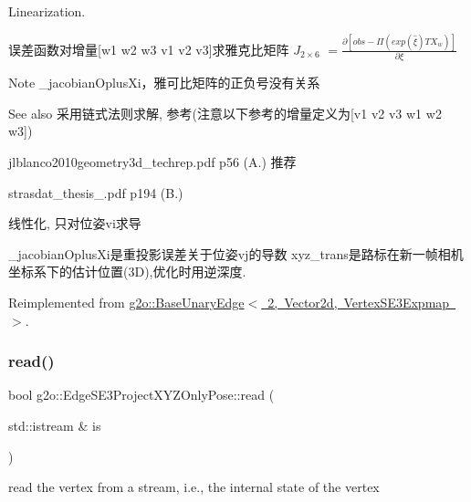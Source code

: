 Linearization. 

误差函数对增量\mbox{[}w1 w2 w3 v1 v2 v3\mbox{]}求雅克比矩阵 $J_{2\times6}$ $ = \frac{\partial [obs - \Pi(exp(\hat{\xi}) T X_w)]}{\partial \xi} $ \begin{DoxyNote}{Note}
\+\_\+jacobian\+Oplus\+Xi，雅可比矩阵的正负号没有关系 
\end{DoxyNote}
\begin{DoxySeeAlso}{See also}
采用链式法则求解, 参考(注意以下参考的增量定义为\mbox{[}v1 v2 v3 w1 w2 w3\mbox{]})
\begin{DoxyItemize}
\item jlblanco2010geometry3d\+\_\+techrep.\+pdf p56 (A.) 推荐
\item strasdat\+\_\+thesis\+\_.\+pdf p194 (B.)
\end{DoxyItemize}
\end{DoxySeeAlso}
线性化, 只对位姿vi求导

\+\_\+jacobian\+Oplus\+Xi是重投影误差关于位姿vj的导数 xyz\+\_\+trans是路标在新一帧相机坐标系下的估计位置(3\+D),优化时用逆深度. 

Reimplemented from \mbox{\hyperlink{classg2o_1_1_base_unary_edge_a367f19b903938faf6e89dd1b0e4e722b}{g2o\+::\+Base\+Unary\+Edge$<$ 2, Vector2d, Vertex\+S\+E3\+Expmap $>$}}.

\mbox{\label{classg2o_1_1_edge_s_e3_project_x_y_z_only_pose_a28994ddf2cab7b61566ce55ad4b43388}} 
\subsubsection{\texorpdfstring{read()}{read()}}
{\footnotesize\ttfamily bool g2o\+::\+Edge\+S\+E3\+Project\+X\+Y\+Z\+Only\+Pose\+::read (\begin{DoxyParamCaption}\item[{std\+::istream \&}]{is }\end{DoxyParamCaption})\hspace{0.3cm}{\ttfamily [virtual]}}



read the vertex from a stream, i.\+e., the internal state of the vertex 



